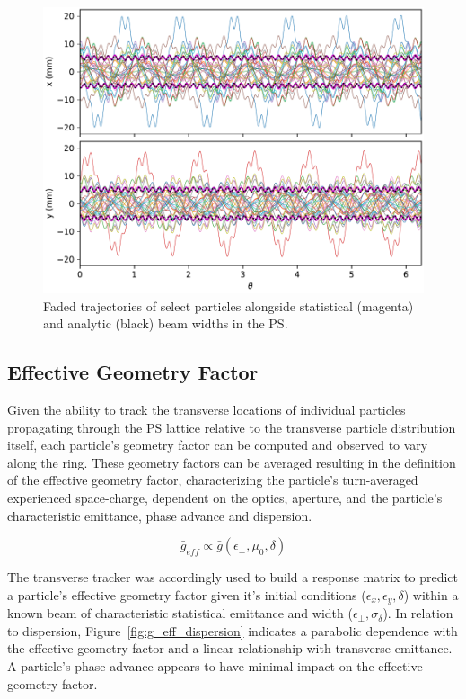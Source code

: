 \begin{figure}
    \centering
    \includegraphics{figs/tracking.pdf}
    \caption{Faded trajectories of select particles alongside statistical (magenta) and analytic (black) beam widths in the PS.}
    \label{fig:trans_tracking}
\end{figure}

\subsection{Effective Geometry Factor}

Given the ability to track the transverse locations of individual particles propagating through the PS lattice relative to the transverse particle distribution itself, each particle's geometry factor can be computed and observed to vary along the ring. These geometry factors can be averaged resulting in the definition of the effective geometry factor, characterizing the particle's turn-averaged experienced space-charge, dependent on the optics, aperture, and the particle's characteristic emittance, phase advance and dispersion.

$$\bar{g}_{eff} \propto \bar{g}(\epsilon_\perp, \mu_0, \delta)$$

The transverse tracker was accordingly used to build a response matrix to predict a particle's effective geometry factor given it's initial conditions ($\epsilon_x, \epsilon_y, \delta$) within a known beam of characteristic statistical emittance and width ($\epsilon_\perp, \sigma_\delta$). In relation to dispersion, Figure~\ref{fig:g_eff_dispersion} indicates a parabolic dependence with the effective geometry factor and a linear relationship with transverse emittance. A particle's phase-advance appears to have minimal impact on the effective geometry factor.

